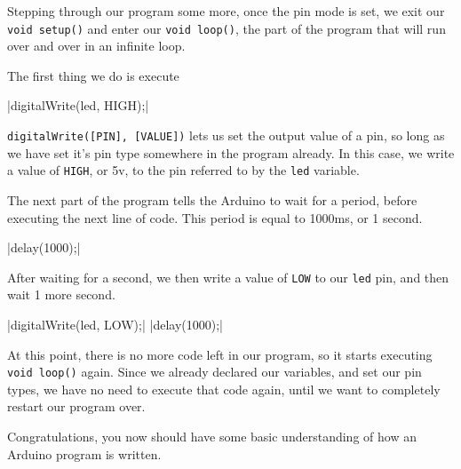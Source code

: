 \documentclass[11pt,a4paper]{article}
\begin{document}
Stepping through our program some more, once the pin mode is set, we exit our \texttt{void setup()} and enter our \texttt{void loop()}, the part of the program that will run over and over in an infinite loop. 

The first thing we do is execute 

|digitalWrite(led, HIGH);|

\texttt{digitalWrite([PIN], [VALUE])} lets us set the output value of a pin, so long as we have set it's pin type somewhere in the program already.  In this case, we write a value of \texttt{HIGH}, or 5v, to the pin referred to by the \texttt{led} variable.

The next part of the program tells the Arduino to wait for a period, before executing the next line of code.  This period is equal to 1000ms, or 1 second.

|delay(1000);|

After waiting for a second, we then write a value of \texttt{LOW} to our \texttt{led} pin, and then wait 1 more second.

|digitalWrite(led, LOW);|
|delay(1000);|

At this point, there is no more code left in our program, so it starts executing \texttt{void loop()} again.  Since we already declared our variables, and set our pin types, we have no need to execute that code again, until we want to completely restart our program over.


Congratulations, you now should have some basic understanding of how an Arduino program is written.




 
 \nocite{*}
\end{document}
